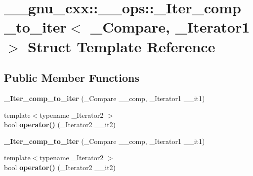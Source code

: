 \hypertarget{struct____gnu__cxx_1_1____ops_1_1__Iter__comp__to__iter}{\section{\+\_\+\+\_\+gnu\+\_\+cxx\+:\+:\+\_\+\+\_\+ops\+:\+:\+\_\+\+Iter\+\_\+comp\+\_\+to\+\_\+iter$<$ \+\_\+\+Compare, \+\_\+\+Iterator1 $>$ Struct Template Reference}
\label{struct____gnu__cxx_1_1____ops_1_1__Iter__comp__to__iter}
}
\subsection*{Public Member Functions}
\begin{DoxyCompactItemize}
\item 
\hypertarget{struct____gnu__cxx_1_1____ops_1_1__Iter__comp__to__iter_a664963b813d56acf2c1d36cf8d63d193}{{\bfseries \+\_\+\+Iter\+\_\+comp\+\_\+to\+\_\+iter} (\+\_\+\+Compare \+\_\+\+\_\+comp, \+\_\+\+Iterator1 \+\_\+\+\_\+it1)}\label{struct____gnu__cxx_1_1____ops_1_1__Iter__comp__to__iter_a664963b813d56acf2c1d36cf8d63d193}

\item 
\hypertarget{struct____gnu__cxx_1_1____ops_1_1__Iter__comp__to__iter_af36f61a907d617f5f0844fbe00dfbf68}{{\footnotesize template$<$typename \+\_\+\+Iterator2 $>$ }\\bool {\bfseries operator()} (\+\_\+\+Iterator2 \+\_\+\+\_\+it2)}\label{struct____gnu__cxx_1_1____ops_1_1__Iter__comp__to__iter_af36f61a907d617f5f0844fbe00dfbf68}

\item 
\hypertarget{struct____gnu__cxx_1_1____ops_1_1__Iter__comp__to__iter_a664963b813d56acf2c1d36cf8d63d193}{{\bfseries \+\_\+\+Iter\+\_\+comp\+\_\+to\+\_\+iter} (\+\_\+\+Compare \+\_\+\+\_\+comp, \+\_\+\+Iterator1 \+\_\+\+\_\+it1)}\label{struct____gnu__cxx_1_1____ops_1_1__Iter__comp__to__iter_a664963b813d56acf2c1d36cf8d63d193}

\item 
\hypertarget{struct____gnu__cxx_1_1____ops_1_1__Iter__comp__to__iter_af36f61a907d617f5f0844fbe00dfbf68}{{\footnotesize template$<$typename \+\_\+\+Iterator2 $>$ }\\bool {\bfseries operator()} (\+\_\+\+Iterator2 \+\_\+\+\_\+it2)}\label{struct____gnu__cxx_1_1____ops_1_1__Iter__comp__to__iter_af36f61a907d617f5f0844fbe00dfbf68}

\end{DoxyCompactItemize}
